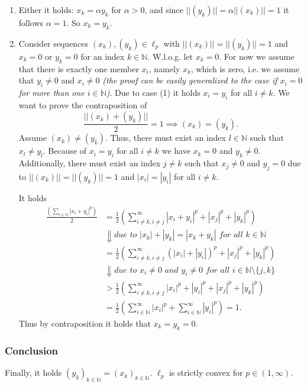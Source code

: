 \documentclass[a4paper]{article}
\begin{document}
\begin{enumerate}[label=(\arabic*)]
\item Either it holds: $x_k = \alpha y_k$ for $\alpha > 0$, and since $||(y_k)|| = \alpha ||(x_k)|| = 1$ it follows $\alpha = 1$. So $x_k = y_k$.

\item Consider sequences $(x_k),(y_k) \in \ell_p$ with $||(x_k)||=||(y_k)|| = 1$ and $x_k = 0$ or $y_k = 0$ for an index $k \in \mathbb N$. W.l.o.g. let $x_k = 0$. For now we assume that there is exactly one member $x_i$, namely $x_k$, which is zero, i.e. we assume that $y_i \neq 0$ and $x_i \neq 0$ \textit{(the proof can be easily generalized to the case if $x_i = 0$ for more than one $i \in \mathbb N$)}. Due to case (1) it holds $x_i = y_i$ for all $i \neq k$. We want to prove the contraposition of 
\[
    \frac{||(x_k)+(y_k)||}{2} = 1  \implies (x_k) = (y_k).
\]
Assume $(x_k) \neq (y_k)$. Thus, there must exist an index $l \in \mathbb N$ such that $x_l \neq y_l$. Because of $x_i = y_i$ for all $i \neq k$ we have $x_k = 0$ and $y_k \neq 0$. Additionally, there must exist an index $j \neq k$ such that $x_j \neq 0$ and $y_j = 0$ due to $||(x_k)||=||(y_k)|| = 1$ and $|x_i| = |y_i|$ for all $i \neq k$.

It holds
\begin{align*}
    \frac{(\sum_{i \in \mathbb N} |x_i+y_i|^p)}{2} &= \frac{1}{2}(\sum^\infty_{i \neq k, i \neq j} |x_i+y_i|^p + |x_j|^p + |y_k|^p) \\
    &\Downarrow \textit{due to $|x_k|+|y_k| = |x_k+y_k|$ for all $k \in \mathbb N$} \\
    &= \frac{1}{2}(\sum^\infty_{i \neq k, i \neq j} (|x_i|+|y_i|)^p + |x_j|^p + |y_k|^p) \\
    &\Downarrow \textit{due to $x_i \neq 0$ and $y_i \neq 0$ for all $i \in \mathbb N \setminus \{ j,k \} $} \\
    &> \frac{1}{2}(\sum^\infty_{i \neq k, i \neq j} |x_i|^p+|y_i|^p + |x_j|^p + |y_k|^p) \\
    &= \frac{1}{2}(\sum^\infty_{i \in \mathbb N} |x_i|^p+\sum^\infty_{i \in \mathbb N}|y_i|^p) = 1.
\end{align*}
Thus by contraposition it holds that $x_k = y_k = 0$.
\end{enumerate}

\subsubsection*{Conclusion}
Finally, it holds
$
    (y_k)_{k \in \mathbb N} = (x_k)_{k \in \mathbb N}.
$
$\ell_p$ is strictly convex for $p \in (1, \infty)$.
\end{document}
